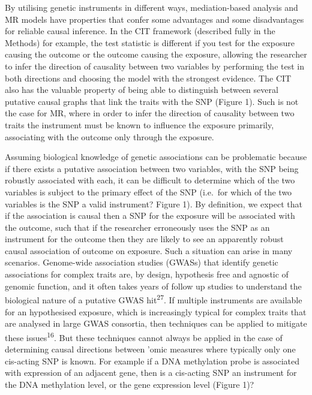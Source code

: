 \documentclass[]{article}
\begin{document}
By utilising genetic instruments in different ways, mediation-based
analysis and MR models have properties that confer some advantages and
some disadvantages for reliable causal inference. In the CIT framework
(described fully in the Methods) for example, the test statistic is
different if you test for the exposure causing the outcome or the
outcome causing the exposure, allowing the researcher to infer the
direction of causality between two variables by performing the test in
both directions and choosing the model with the strongest evidence. The
CIT also has the valuable property of being able to distinguish between
several putative causal graphs that link the traits with the SNP (Figure
1). Such is not the case for MR, where in order to infer the direction
of causality between two traits the instrument must be known to
influence the exposure primarily, associating with the outcome only
through the exposure.

Assuming biological knowledge of genetic associations can be problematic
because if there exists a putative association between two variables,
with the SNP being robustly associated with each, it can be difficult to
determine which of the two variables is subject to the primary effect of
the SNP (i.e.~for which of the two variables is the SNP a valid
instrument? Figure 1). By definition, we expect that if the association
is causal then a SNP for the exposure will be associated with the
outcome, such that if the researcher erroneously uses the SNP as an
instrument for the outcome then they are likely to see an apparently
robust causal association of outcome on exposure. Such a situation can
arise in many scenarios. Genome-wide association studies (GWASs) that
identify genetic associations for complex traits are, by design,
hypothesis free and agnostic of genomic function, and it often takes
years of follow up studies to understand the biological nature of a
putative GWAS hit\textsuperscript{27}. If multiple instruments are
available for an hypothesised exposure, which is increasingly typical
for complex traits that are analysed in large GWAS consortia, then
techniques can be applied to mitigate these issues\textsuperscript{16}.
But these techniques cannot always be applied in the case of determining
causal directions between 'omic measures where typically only one
cis-acting SNP is known. For example if a DNA methylation probe is
associated with expression of an adjacent gene, then is a cis-acting SNP
an instrument for the DNA methylation level, or the gene expression
level (Figure 1)?
\end{document}
